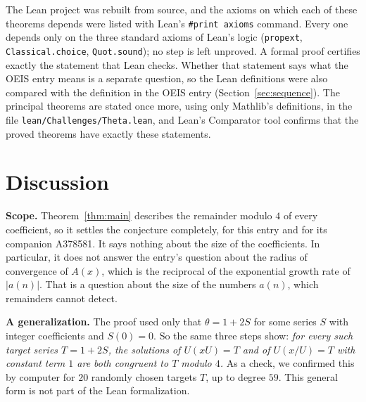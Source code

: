 \documentclass[11pt,a4paper]{article}
\theoremstyle{definition}
\theoremstyle{remark}
\newcommand{\para}[1]{\par\medskip\noindent\textbf{#1}\enspace}
\begin{document}
The Lean project was rebuilt from source, and the axioms on which each of these theorems depends were listed with
Lean's \texttt{\#print axioms} command. Every one depends only on the three standard axioms of Lean's logic
(\texttt{propext}, \texttt{Classical.choice}, \texttt{Quot.sound}); no step is left unproved. A formal proof certifies
exactly the statement that Lean checks. Whether that statement says what the OEIS entry means is a separate question,
so the Lean definitions were also compared with the definition in the OEIS entry
(Section~\ref{sec:sequence}). The principal theorems are stated once more, using only Mathlib's definitions, in the
file \texttt{lean/Challenges/Theta.lean}, and Lean's Comparator tool confirms that the
proved theorems have exactly these statements.

\section{Discussion}\label{sec:discussion}

\para{Scope.} Theorem~\ref{thm:main} describes the remainder modulo $4$ of every coefficient, so it settles the
conjecture completely, for this entry and for its companion A378581. It says nothing about the size of the
coefficients. In particular, it does not answer the entry's question about the radius of convergence of
$A(x)$, which is the reciprocal of the exponential growth rate of $|a(n)|$. That is a question about the size of
the numbers $a(n)$, which remainders cannot detect.

\para{A generalization.} The proof used only that $\theta=1+2S$ for some series $S$ with integer coefficients and
$S(0)=0$. So the same three steps show: \emph{for every such target series $T=1+2S$, the solutions of $U(xU)=T$ and of
$U(x/U)=T$ with constant term $1$ are both congruent to $T$ modulo $4$.} As a check, we confirmed this by computer for
$20$ randomly chosen targets $T$, up to degree $59$. This general form is not part of the Lean formalization.
\end{document}
